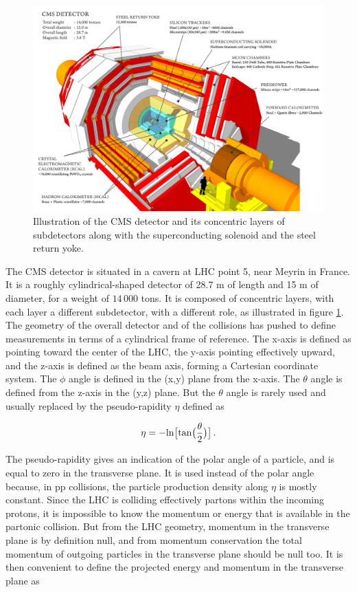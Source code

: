 \begin{figure}
    \centering
    \includegraphics[width=\textwidth]{Images/CMS_subdetectors.png}
    \caption{Illustration of the CMS detector and its concentric layers of subdetectors along with the superconducting solenoid and the steel return yoke.}
    \label{fig:CMS_subdetectors}
\end{figure}

The CMS detector is situated in a cavern at LHC point 5, near Meyrin in France. It is a roughly cylindrical-shaped detector of 28.7 m of length and 15 m of diameter, for a weight of $14\,000$ tons. It is composed of concentric layers, with each layer a different subdetector, with a different role, as illustrated in figure \ref{fig:CMS_subdetectors}. The geometry of the overall detector and of the collisions has pushed to define measurements in terms of a cylindrical frame of reference. The x-axis is defined as pointing toward the center of the LHC, the y-axis pointing effectively upward, and the z-axis is defined as the beam axis, forming a Cartesian coordinate system. The $\phi$ angle is defined in the (x,y) plane from the x-axis. The $\theta$ angle is defined from the z-axis in the (y,z) plane. But the $\theta$ angle is rarely used and usually replaced by the pseudo-rapidity $\eta$ defined as

\begin{equation}
    \eta = - \mathrm{ln} \big[ \mathrm{tan} \big(\frac{\theta}{2}\big)\big] \mend
\end{equation}

The pseudo-rapidity gives an indication of the polar angle of a particle, and is equal to zero in the transverse plane. It is used instead of the polar angle because, in pp collisions, the particle production density along $\eta$ is mostly constant. Since the LHC is colliding effectively partons within the incoming protons, it is impossible to know the momentum or energy that is available in the partonic collision. But from the LHC geometry, momentum in the transverse plane is by definition null, and from momentum conservation the total momentum of outgoing particles in the transverse plane should be null too. It is then convenient to define the projected energy and momentum in the transverse plane as

